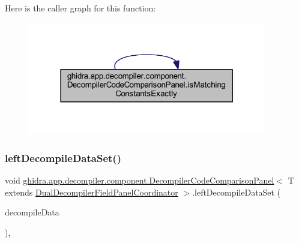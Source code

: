 Here is the caller graph for this function\+:
\nopagebreak
\begin{figure}[H]
\begin{center}
\leavevmode
\includegraphics[width=295pt]{classghidra_1_1app_1_1decompiler_1_1component_1_1_decompiler_code_comparison_panel_ab328dba06a2bffb6f14a7c994719ab6b_icgraph}
\end{center}
\end{figure}
\mbox{\label{classghidra_1_1app_1_1decompiler_1_1component_1_1_decompiler_code_comparison_panel_ab419ff195f6626a7449243d3410faf04}} 
\subsubsection{\texorpdfstring{leftDecompileDataSet()}{leftDecompileDataSet()}}
{\footnotesize\ttfamily void \mbox{\hyperlink{classghidra_1_1app_1_1decompiler_1_1component_1_1_decompiler_code_comparison_panel}{ghidra.\+app.\+decompiler.\+component.\+Decompiler\+Code\+Comparison\+Panel}}$<$ T extends \mbox{\hyperlink{classghidra_1_1app_1_1decompiler_1_1component_1_1_dual_decompiler_field_panel_coordinator}{Dual\+Decompiler\+Field\+Panel\+Coordinator}} $>$.left\+Decompile\+Data\+Set (\begin{DoxyParamCaption}\item[{\mbox{\hyperlink{classghidra_1_1app_1_1decompiler_1_1component_1_1_decompile_data}{Decompile\+Data}}}]{decompile\+Data }\end{DoxyParamCaption})\hspace{0.3cm}{\ttfamily [inline]}, {\ttfamily [protected]}}



